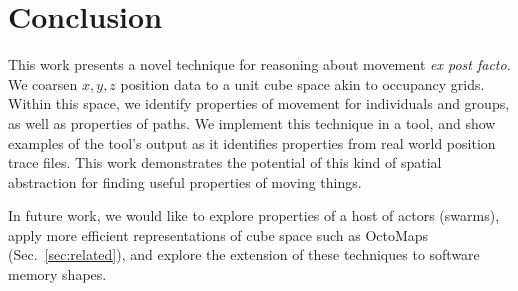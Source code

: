 \section{Conclusion}
\label{sec:conclusion}

This work presents a novel technique for reasoning about movement \emph{ex post facto}.
We coarsen $x,y,z$ position data to a unit cube space akin to occupancy grids.
Within this space, we identify properties of movement for individuals and groups, as well as properties of paths.
We implement this technique in a tool, and show examples of the tool's output as it identifies properties from real world position trace files.
This work demonstrates the potential of this kind of spatial abstraction for finding useful properties of moving things.

In future work, we would like to explore properties of a host of actors (swarms), apply more efficient representations of cube space such as OctoMaps (Sec.~\ref{sec:related}), and explore the extension of these techniques to software memory shapes.



